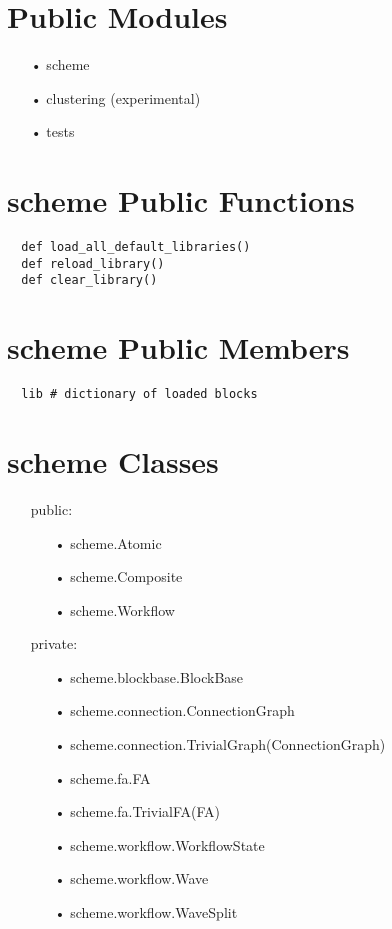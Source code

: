\documentclass[a4paper,16pt]{article}
\begin{document}
\lstset{language=Python} 

\section{Public Modules}
\begin{enumerate}
\item[•] scheme
\item[•] clustering  (experimental)
\item[•] tests
\end{enumerate}


\section{scheme Public Functions}
\begin{lstlisting}
  def load_all_default_libraries()
  def reload_library()
  def clear_library()
\end{lstlisting}


\section{scheme Public Members}

\begin{lstlisting}
  lib # dictionary of loaded blocks
\end{lstlisting}

\section{scheme Classes}
\begin{enumerate}
  \item[public:]
    \begin{enumerate}
      \item[•] scheme.Atomic
      \item[•] scheme.Composite
      \item[•] scheme.Workflow
    \end{enumerate}
  \item[private:]
    \begin{enumerate}
      \item[•] scheme.blockbase.BlockBase
      \item[•] scheme.connection.ConnectionGraph
      \item[•] scheme.connection.TrivialGraph(ConnectionGraph)
      \item[•] scheme.fa.FA
      \item[•] scheme.fa.TrivialFA(FA)
      \item[•] scheme.workflow.WorkflowState
      \item[•] scheme.workflow.Wave   
      \item[•] scheme.workflow.WaveSplit   
    \end{enumerate}
\end{enumerate}
\end{document}
